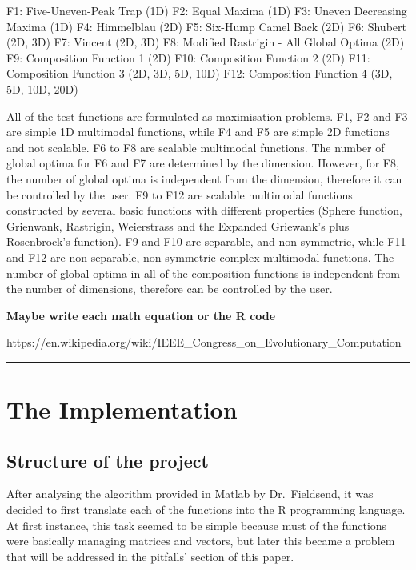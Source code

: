 \documentclass[12pt,a4paper]{article}
\begin{document}
F1: Five-Uneven-Peak Trap (1D) F2: Equal Maxima (1D) F3: Uneven
Decreasing Maxima (1D) F4: Himmelblau (2D) F5: Six-Hump Camel Back (2D)
F6: Shubert (2D, 3D) F7: Vincent (2D, 3D) F8: Modified Rastrigin - All
Global Optima (2D) F9: Composition Function 1 (2D) F10: Composition
Function 2 (2D) F11: Composition Function 3 (2D, 3D, 5D, 10D) F12:
Composition Function 4 (3D, 5D, 10D, 20D)

All of the test functions are formulated as maximisation problems. F1,
F2 and F3 are simple 1D multimodal functions, while F4 and F5 are simple
2D functions and not scalable. F6 to F8 are scalable multimodal
functions. The number of global optima for F6 and F7 are determined by
the dimension. However, for F8, the number of global optima is
independent from the dimension, therefore it can be controlled by the
user. F9 to F12 are scalable multimodal functions constructed by several
basic functions with different properties (Sphere function, Grienwank,
Rastrigin, Weierstrass and the Expanded Griewank's plus Rosenbrock's
function). F9 and F10 are separable, and non-symmetric, while F11 and
F12 are non-separable, non-symmetric complex multimodal functions. The
number of global optima in all of the composition functions is
independent from the number of dimensions, therefore can be controlled
by the user.

\textbf{Maybe write each math equation or the R code}

https://en.wikipedia.org/wiki/IEEE\_Congress\_on\_Evolutionary\_Computation

\begin{center}\rule{0.5\linewidth}{\linethickness}\end{center}

\section{The Implementation}\label{the-implementation}

\subsection{Structure of the project}\label{structure-of-the-project}

After analysing the algorithm provided in Matlab by Dr.~Fieldsend, it
was decided to first translate each of the functions into the R
programming language. At first instance, this task seemed to be simple
because must of the functions were basically managing matrices and
vectors, but later this became a problem that will be addressed in the
pitfalls' section of this paper.
\end{document}
